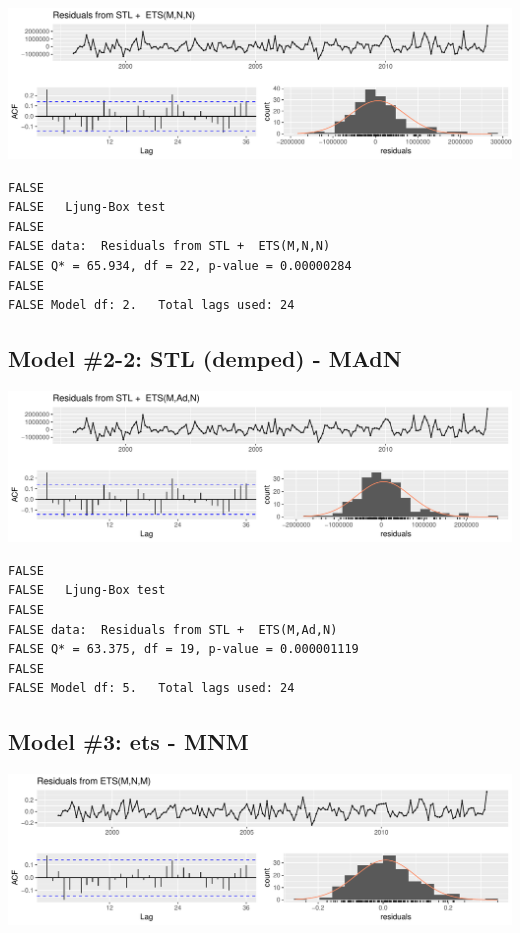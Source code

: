 \documentclass[openany]{book}
\begin{document}
\includegraphics{Group2_Project1_Fall2019_files/figure-latex/unnamed-chunk-12-1.pdf}

\begin{verbatim}
FALSE 
FALSE   Ljung-Box test
FALSE 
FALSE data:  Residuals from STL +  ETS(M,N,N)
FALSE Q* = 65.934, df = 22, p-value = 0.00000284
FALSE 
FALSE Model df: 2.   Total lags used: 24
\end{verbatim}

\hypertarget{model-2-2-stl-demped---madn}{%
\subsection{Model \#2-2: STL (demped) -
MAdN}\label{model-2-2-stl-demped---madn}}

\includegraphics{Group2_Project1_Fall2019_files/figure-latex/unnamed-chunk-13-1.pdf}

\begin{verbatim}
FALSE 
FALSE   Ljung-Box test
FALSE 
FALSE data:  Residuals from STL +  ETS(M,Ad,N)
FALSE Q* = 63.375, df = 19, p-value = 0.000001119
FALSE 
FALSE Model df: 5.   Total lags used: 24
\end{verbatim}

\hypertarget{model-3-ets---mnm}{%
\subsection{Model \#3: ets - MNM}\label{model-3-ets---mnm}}

\includegraphics{Group2_Project1_Fall2019_files/figure-latex/unnamed-chunk-14-1.pdf}
\end{document}
